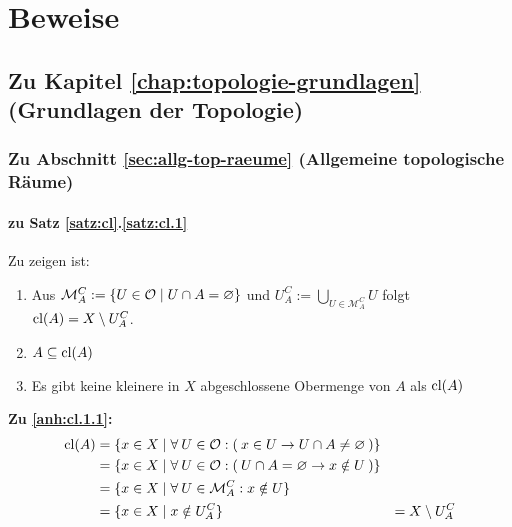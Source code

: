 \chapter{Beweise}
\section{Zu Kapitel \ref{chap:topologie-grundlagen} (Grundlagen der Topologie)}

\subsection{Zu Abschnitt \ref{sec:allg-top-raeume} (Allgemeine topologische Räume)}


\subsubsection{zu Satz \ref{satz:cl}.\ref{satz:cl.1}}\label{anh:cl.1}
    Zu zeigen ist: 
    \begin{enumerate}
        \item Aus $\mathcal{M}_A^C := \{ U \in \mathcal{O} \mid U \cap A = \varnothing\}$ und $U_A^C := \bigcup\limits_{U \in \mathcal{M}_A^C} U$ folgt $\text{cl}(A) = X \setminus U_A^C$. \label{anh:cl.1.1}
        \item $A \subseteq \text{cl}(A)$ \label{anh:cl.1.2}
        \item Es gibt keine kleinere in $X$ abgeschlossene Obermenge von $A$ als $\text{cl}(A)$ \label{anh:cl.1.3}
    \end{enumerate}

    \noindent	
    \textbf{Zu \ref{anh:cl.1.1}:}
        \begin{align*}
            \text{cl}(A) &= \{x \in X \mid \forall\: U \in \mathcal{O} : (\: x \in U \rightarrow U \cap A \neq \varnothing \:) \} &\\
            &= \{x \in X \mid \forall\: U \in \mathcal{O} : (\: U \cap A = \varnothing \rightarrow x \notin U \:) \} &\\
            &= \{x \in X \mid \forall\: U \in \mathcal{M}_A^C : x \notin U \} &\\
            &= \{x \in X \mid x \notin U_A^C \} &= X \setminus U_A^C
        \end{align*}

